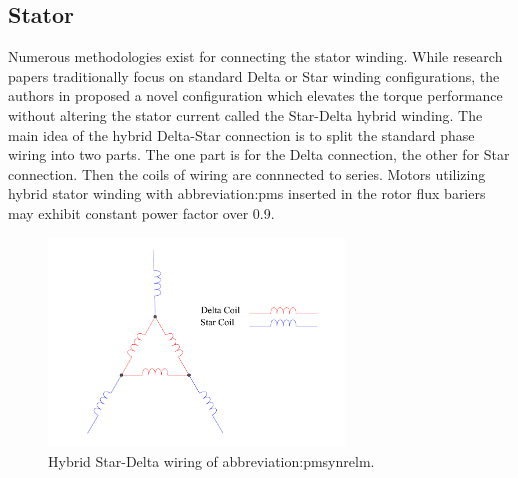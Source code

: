 \documentclass[a4paper, twoside, 11pt]{article}
\begin{document}
    \subsection{Stator}
        Numerous methodologies exist for connecting the stator winding. While research papers traditionally focus on standard Delta or Star winding configurations, the authors in \cite{ibrahim-an-improved-torque-density-synchronous-reluctance-machine-with-a-combined-star-delta-winding-layout, ibrahim-permanent-magnet-assisted-synchronous-reluctance-motor-employing-a-hybrid-star-delta-winding-for-high-speed-applicaitons} proposed a novel configuration which elevates the torque performance without altering the stator current called the Star-Delta hybrid winding. The main idea of the hybrid Delta-Star connection is to split the standard phase wiring into two parts. The one part is for the Delta connection, the other for Star connection. Then the coils of wiring are connnected to series. Motors utilizing hybrid stator winding with \gls{abbreviation:pm}s inserted in the rotor flux bariers may exhibit constant power factor over 0.9. \cite{ibrahim-permanent-magnet-assisted-synchronous-reluctance-motor-employing-a-hybrid-star-delta-winding-for-high-speed-applicaitons}

        \begin{figure}[htbp!]
            \centering
            \includegraphics[width=0.7\textwidth]{src/pdf/hybrid-star-delta-wiring.pdf}
            \caption{Hybrid Star-Delta wiring of \gls{abbreviation:pmsynrelm}.}
            \label{fig:hybrid-star-delta-wiring}
        \end{figure}
\end{document}
